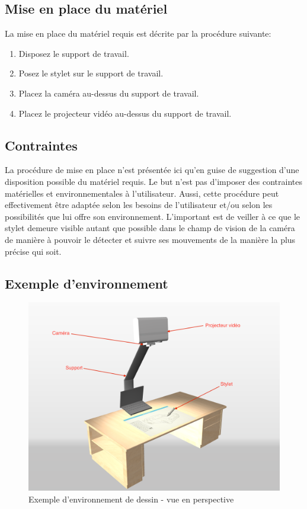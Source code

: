 \documentclass[11pt,a4paper,oldfontcommands]{memoir}
\begin{document}
\subsection{Mise en place du matériel}

La mise en place du matériel requis est décrite par la procédure suivante:

\begin{enumerate}
\item Disposez le support de travail.
\item Posez le stylet sur le support de travail.
\item Placez la caméra au-dessus du support de travail.
\item Placez le projecteur vidéo au-dessus du support de travail.
\end{enumerate}

\subsection{Contraintes}

La procédure de mise en place n'est présentée ici qu'en guise de suggestion d'une disposition possible du matériel requis. Le but n'est pas d'imposer des contraintes matérielles et environnementales à l'utilisateur. Aussi, cette procédure peut effectivement être adaptée selon les besoins de l'utilisateur et/ou selon les possibilités que lui offre son environnement. L'important est de veiller à ce que le stylet demeure visible autant que possible dans le champ de vision de la caméra de manière à pouvoir le détecter et suivre ses mouvements de la manière la plus précise qui soit.

\subsection{Exemple d'environnement}

\begin{figure}[h]
\centering
\includegraphics[angle=90, scale=0.15]{images/drawing-environment.png}
\caption{Exemple d'environnement de dessin - vue en perspective}
\end{figure}
\end{document}
